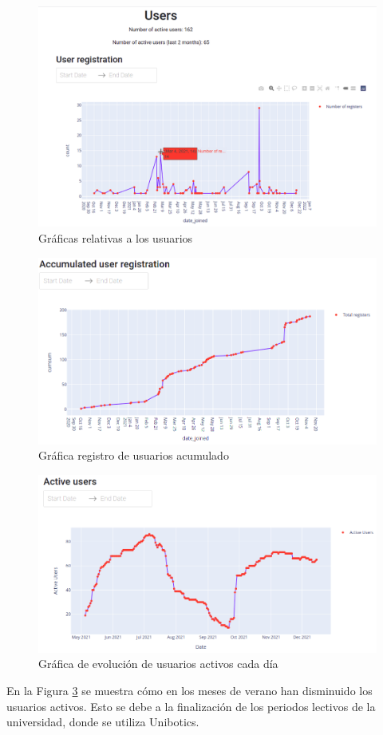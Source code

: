 \begin{figure}[H]
    \centering
    \includegraphics[width=14cm, keepaspectratio]{img/users.png}
    \caption{Gráficas relativas a los usuarios}
    \label{fig:users}
\end{figure}
\begin{figure}[H]
    \centering
    \includegraphics[width=14cm, keepaspectratio]{img/accumulated.png}
    \caption{Gráfica registro de usuarios acumulado}
    \label{fig:accumulated}
\end{figure}
\begin{figure}[H]
    \centering
    \includegraphics[width=15cm, keepaspectratio]{img/active.png}
    \caption{Gráfica de evolución de usuarios activos cada día}
    \label{fig:active}
\end{figure}
En la Figura \ref{fig:active} se muestra cómo en los meses de verano han disminuido los usuarios activos. Esto se debe a la finalización de los periodos lectivos de la universidad, donde se utiliza Unibotics.\\

